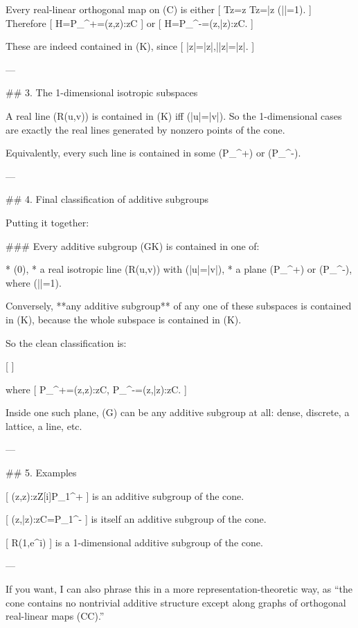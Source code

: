 Every real-linear orthogonal map on (\mathbf C) is either
[
Tz=\lambda z \quad{}\quad Tz=\lambda \bar z
\qquad (|\lambda|=1).
]
Therefore
[
H=P_\lambda^{+}={(z,\lambda z):z\in\mathbf C}
]
or
[
H=P_\lambda^{-}={(z,\lambda\bar z):z\in\mathbf C}.
]

These are indeed contained in (K), since
[
|\lambda z|=|z|,\qquad |\lambda \bar z|=|z|.
]

---

## 3. The 1-dimensional isotropic subspaces

A real line (\mathbf R\cdot (u,v)) is contained in (K) iff (|u|=|v|).
So the 1-dimensional cases are exactly the real lines generated by nonzero points of the cone.

Equivalently, every such line is contained in some (P_\lambda^+) or (P_\lambda^-).

---

## 4. Final classification of additive subgroups

Putting it together:

### Every additive subgroup (G\subset K) is contained in one of:

* ({0}),
* a real isotropic line (\mathbf R\cdot (u,v)) with (|u|=|v|),
* a plane (P_\lambda^+) or (P_\lambda^-), where (|\lambda|=1).

Conversely, **any additive subgroup** of any one of these subspaces is contained in (K), because the whole subspace is contained in (K).

So the clean classification is:

[
]

where
[
P_\lambda^+={(z,\lambda z):z\in\mathbf C},
\qquad
P_\lambda^-={(z,\lambda\bar z):z\in\mathbf C}.
]

Inside one such plane, (G) can be any additive subgroup at all: dense, discrete, a lattice, a line, etc.

---

## 5. Examples

[
{(z,z):z\in\mathbf Z[i]}\subset P_1^+
]
is an additive subgroup of the cone.

[
{(z,\bar z):z\in\mathbf C}=P_1^-
]
is itself an additive subgroup of the cone.

[
\mathbf R\cdot(1,e^{i\theta})
]
is a 1-dimensional additive subgroup of the cone.

---

If you want, I can also phrase this in a more representation-theoretic way, as “the cone contains no nontrivial additive structure except along graphs of orthogonal real-linear maps (\mathbf C\to\mathbf C).”

